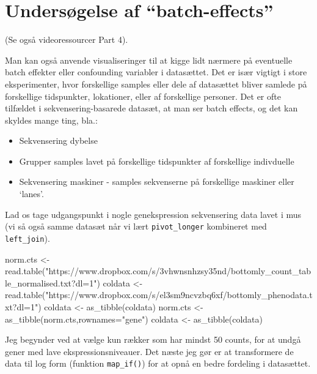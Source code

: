 \documentclass[
]{book}
\newenvironment{Shaded}{\begin{snugshade}}{\end{snugshade}}
\newcommand{\AttributeTok}[1]{\textcolor[rgb]{0.77,0.63,0.00}{#1}}
\newcommand{\FunctionTok}[1]{\textcolor[rgb]{0.00,0.00,0.00}{#1}}
\newcommand{\NormalTok}[1]{#1}
\newcommand{\OtherTok}[1]{\textcolor[rgb]{0.56,0.35,0.01}{#1}}
\newcommand{\StringTok}[1]{\textcolor[rgb]{0.31,0.60,0.02}{#1}}
\providecommand{\tightlist}{%
  \setlength{\itemsep}{0pt}\setlength{\parskip}{0pt}}
\begin{document}
\hypertarget{undersuxf8gelse-af-batch-effects}{%
\section{Undersøgelse af ``batch-effects''}\label{undersuxf8gelse-af-batch-effects}}

(Se også videoressourcer Part 4).

Man kan også anvende visualiseringer til at kigge lidt nærmere på eventuelle batch effekter eller confounding variabler i datasættet. Det er især vigtigt i store eksperimenter, hvor forskellige samples eller dele af datasættet bliver samlede på forskellige tidspunkter, lokationer, eller af forskellige personer. Det er ofte tilfældet i sekvensering-basarede datasæt, at man ser batch effects, og det kan skyldes mange ting, bla.:

\begin{itemize}
\tightlist
\item
  Sekvensering dybelse
\item
  Grupper samples lavet på forskellige tidspunkter af forskellige indivduelle
\item
  Sekvensering maskiner - samples sekvenserne på forskellige maskiner eller `lanes'.
\end{itemize}

Lad os tage udgangspunkt i nogle genekspression sekvensering data lavet i mus (vi så også samme datasæt når vi lært \texttt{pivot\_longer} kombineret med \texttt{left\_join}).

\begin{Shaded}
\begin{Highlighting}[]
\NormalTok{norm.cts }\OtherTok{\textless{}{-}} \FunctionTok{read.table}\NormalTok{(}\StringTok{"https://www.dropbox.com/s/3vhwnsnhzsy35nd/bottomly\_count\_table\_normalised.txt?dl=1"}\NormalTok{)}
\NormalTok{coldata }\OtherTok{\textless{}{-}} \FunctionTok{read.table}\NormalTok{(}\StringTok{"https://www.dropbox.com/s/el3sm9ncvzbq6xf/bottomly\_phenodata.txt?dl=1"}\NormalTok{)}
\NormalTok{coldata }\OtherTok{\textless{}{-}} \FunctionTok{as\_tibble}\NormalTok{(coldata)}
\NormalTok{norm.cts }\OtherTok{\textless{}{-}} \FunctionTok{as\_tibble}\NormalTok{(norm.cts,}\AttributeTok{rownames=}\StringTok{"gene"}\NormalTok{)}
\NormalTok{coldata }\OtherTok{\textless{}{-}} \FunctionTok{as\_tibble}\NormalTok{(coldata)}
\end{Highlighting}
\end{Shaded}

Jeg begynder ved at vælge kun rækker som har mindst 50 counts, for at undgå gener med lave ekspressionsniveauer. Det næste jeg gør er at transformere de data til log form (funktion \texttt{map\_if()}) for at opnå en bedre fordeling i datasættet.
\end{document}
